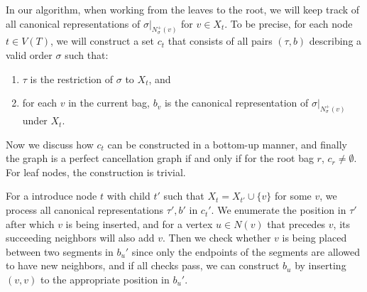 \documentclass[a4paper,cleveref, autoref, 11pt, fleqn, thm-restate]{article}
\theoremstyle{plain}
\begin{document}
In our algorithm, when working from the leaves to the root, we will keep track of all canonical representations of $\sigma|_{N_{\sigma}^{+}(v)}$ for $v\in X_t$. To be precise, for each node $t\in V(T)$, we will construct a set $c_t$ that consists of all pairs $(\tau,b)$ describing a valid order $\sigma$ such that:
\begin{enumerate}[label={(V\arabic*)},left=10pt]
  \item $\tau$ is the restriction of $\sigma$ to $X_t$, and
  \item for each $v$ in the current bag, $b_v$ is the canonical representation of $\sigma|_{N_{\sigma}^{+}(v)}$ under $X_t$.
\end{enumerate}
Now we discuss how $c_t$ can be constructed in a bottom-up manner, and finally the graph is a perfect cancellation graph if and only if for the root bag $r$, $c_r\not=\emptyset$. For leaf nodes, the construction is trivial.

For a introduce node $t$ with child $t'$ such that $X_t=X_{t'}\cup \{v\}$ for some $v$, we process all canonical representations $\tau',b'$ in $c_t'$. We enumerate the position in $\tau'$ after which $v$ is being inserted, and for a vertex $u\in N(v)$ that precedes $v$, its succeeding neighbors will also add $v$. Then we check whether $v$ is being placed between two segments in $b_u'$ since only the endpoints of the segments are allowed to have new neighbors, and if all checks pass, we can construct $b_u$ by inserting $(v,v)$ to the appropriate position in $b_u'$.
\begin{center}
\end{center}
\end{document}
